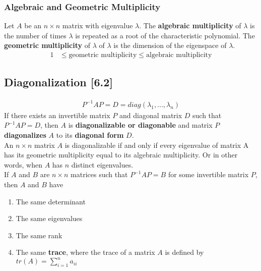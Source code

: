 \documentclass[a4paper,9pt]{extarticle}
\begin{document}
\begin{multicols*}{2}
\subsubsection{Algebraic and Geometric Multiplicity}
Let $A$ be an $n \times n$ matrix with eigenvalue $\lambda$. The \textbf{algebraic multiplicity} of $\lambda$ is the number of times $\lambda$ is repeated as a root of the characteristic polynomial. The \textbf{geometric multiplicity} of $\lambda$ of $\lambda$ is the dimension of the eigenspace of $\lambda$.
\begin{equation} \label{6.1-3}
    \begin{split}
        1 & \leq \textrm{geometric multiplicity} \leq \textrm{algebraic multiplicity}
    \end{split}
\end{equation}


\subsection{Diagonalization [6.2]}
\begin{equation} \label{6.2-1}
    \begin{split}
        P^{-1} A P = D = diag(\lambda_1, ..., \lambda_n)
    \end{split}
\end{equation}
If there exists an invertible matrix $P$ and diagonal matrix $D$ such that $P^{-1} A P = D$, then $A$ is \textbf{diagonalizable or diagonable} and matrix $P$ \textbf{diagonalizes} $A$ to its \textbf{diagonal form} $D$. \\

An $n \times n$ matrix $A$ is diagonalizable if and only if every eigenvalue of matrix A has its geometric multiplicity equal to its algebraic multiplicity. Or in other words, when $A$ has $n$ distinct eigenvalues. \\

If $A$ and $B$ are $n \times n$ matrices such that $P^{-1} A P = B$ for some invertible matrix $P$, then $A$ and $B$ have

\begin{enumerate}[label=\bfseries (\arabic*)] \itemsep0pt \parskip0pt 
    \item The same determinant
    \item The same eigenvalues
    \item The same rank
    \item The same \textbf{trace}, where the trace of a matrix $A$ is defined by $tr(A) = \sum^{n}_{i=1} a_{ii}$
\end{enumerate}


\end{multicols*}
\end{document}
